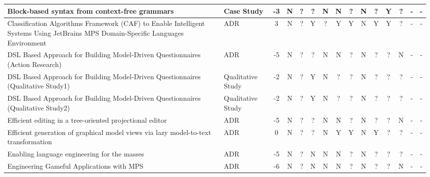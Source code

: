 \begin{landscape}
\begin{longtable}{ | p{11cm} | l | *{13}{c|} }
        Block-based syntax from context-free grammars\cite{addazi2021blended_SLR}                                                                                              & Case Study        &  -3   & N & ? & ? & N & N & ? & N & ? & Y & ?  & - & - \\\hline
        Classification Algorithms Framework (CAF) to Enable Intelligent Systems Using JetBrains MPS Domain-Specific Languages Environment\cite{meacham2020classification_SLR}  & ADR               &  3    & N & ? & Y & ? & Y & Y & N & Y & Y & ?  & - & - \\\hline
        DSL Based Approach for Building Model-Driven Questionnaires (Action Research)\cite{furtado2021dsl_SLR}                                                                 & ADR               &  -5   & N & ? & ? & N & N & ? & N & ? & ? & N  & - & - \\\hline
        DSL Based Approach for Building Model-Driven Questionnaires (Qualitative Study1)\cite{furtado2021dsl_SLR}                                                              & Qualitative Study &  -2   & N & ? & Y & N & ? & ? & N & ? & ? & ?  & - & - \\\hline
        DSL Based Approach for Building Model-Driven Questionnaires (Qualitative Study2)\cite{furtado2021dsl_SLR}                                                              & Qualitative Study &  -2   & N & ? & Y & N & ? & ? & N & ? & ? & ?  & - & - \\\hline
        Efficient editing in a tree-oriented projectional editor\cite{beckmann2020efficient_SLR}                                                                               & ADR               &  -5   & N & ? & ? & N & N & ? & N & ? & ? & N  & - & - \\\hline
        Efficient generation of graphical model views via lazy model-to-text transformation\cite{kolovos2020efficient_SLR}                                                     & ADR               &  0    & N & ? & ? & N & Y & Y & N & Y & ? & ?  & - & - \\\hline
        Enabling language engineering for the masses\cite{barash2020enabling_SLR}                                                                                              & ADR               &  -5   & N & ? & N & N & N & ? & N & ? & ? & ?  & - & - \\\hline
        Engineering Gameful Applications with MPS\cite{bucchiarone2021engineering_SLR}                                                                                         & ADR               &  -6   & N & ? & N & N & N & ? & N & ? & ? & N  & - & - \\\hline

\end{longtable}
\end{landscape}
